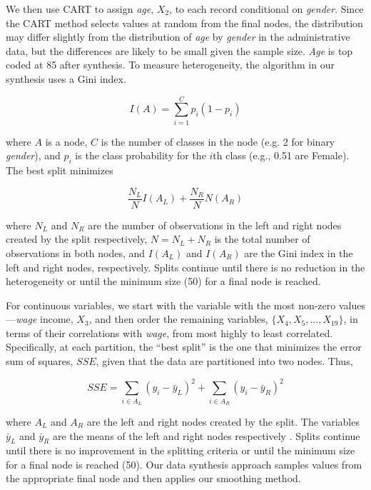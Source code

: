 \documentclass[11pt,runningheads,oribibl]{llncs}
\begin{document}
We then use CART to assign \textit{age}, $X_2$, to each record conditional on \textit{gender}. Since the CART method selects values at random from the final nodes, the distribution may differ slightly from the distribution of \textit{age} by \textit{gender} in the administrative data, but the differences are likely to be small given the sample size. \textit{Age} is top coded at 85 after synthesis. To measure heterogeneity, the algorithm in our synthesis uses a Gini index.

\begin{equation}
    I(A)=\sum_{i=1}^C p_i (1-p_i)
\end{equation}

\noindent where $A$ is a node, $C$ is the number of classes in the node (e.g. 2 for binary \textit{gender}), and $p_i$ is the class probability for the $i$th class (e.g., 0.51 are Female). The best split minimizes 

\begin{equation}
    \frac{N_L}{N}I(A_L)+\frac{N_R}{N}N(A_R)
\end{equation}

\noindent where $N_L$ and $N_R$ are the number of observations in the left and right nodes created by the split respectively, $N= N_L+N_R$ is the total number of observations in both nodes, and $I(A_L)$ and $I(A_R)$ are the Gini index in the left and right nodes, respectively. Splits continue until there is no reduction in the heterogeneity or until the minimum size (50) for a final node is reached. 

For continuous variables, we start with the variable with the most non-zero values—\textit{wage} income, $X_3$, and then order the remaining variables, $\{X_4, X_5,..., X_19\}$, in terms of their correlations with \textit{wage}, from most highly to least correlated. Specifically, at each partition, the ``best split'' is the one that minimizes the error sum of squares, $SSE$, given that the data are partitioned into two nodes. Thus, 

\begin{equation}
    SSE=\sum_{i\in A_L}(y_i-\bar{y}_L)^2 + \sum_{i\in A_R}(y_i-\bar{y}_R)^2
\end{equation}

\noindent where $A_L$ and $A_R$ are the left and right nodes created by the split. The variables $\bar{y}_L$ and $\bar{y}_R$ are the means of the left and right nodes respectively \citep{kuhn2013applied}. Splits continue until there is no improvement in the splitting criteria or until the minimum size for a final node is reached (50). Our data synthesis approach samples values from the appropriate final node and then applies our smoothing method. 
\end{document}

